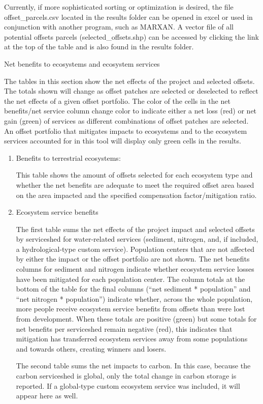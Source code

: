 \documentclass[11pt,letterpaper]{report}
\newenvironment{myenumerate}{%
	\edef\backupindent{\the\parindent}
	\enumerate
	\setlength{\parindent}{\backupindent}
		\setlist[enumerate,1]{label=(\arabic*)}
		\setlist[enumerate,2]{label=(\arabic*)}
}{\endenumerate}
\begin{document}
\begin{myenumerate}
			Currently, if more sophisticated sorting or optimization is desired, the file offset\_{}parcels.csv located in the results folder can be opened in excel or used in conjunction with another program, such as MARXAN. A vector file of all potential offsets parcels (selected\_{}offsets.shp) can be accessed by clicking the link at the top of the table and is also found in the results folder.
		
		{\bfseries \item  Net benefits to ecosystems and ecosystem services}
		
			The tables in this section show the net effects of the project and selected offsets. The totals shown will change as offset patches are selected or deselected to reflect the net effects of a given offset portfolio. The color of the cells in the net benefits/net service column change color to indicate either a net loss (red) or net gain (green) of services as different combinations of offset patches are selected. An offset portfolio that mitigates impacts to ecosystems and to the ecosystem services accounted for in this tool will display only green cells in the results. 
			
			\begin{enumerate}[label=\alph*]
				\item Benefits to terrestrial ecosystems:
				
					This table shows the amount of offsets selected for each ecosystem type and whether the net benefits are adequate to meet the required offset area based on the area impacted and the specified compensation factor/mitigation ratio.
					
				\item Ecosystem service benefits
				
					The first table sums the net effects of the project impact and selected offsets by serviceshed for water-related services (sediment, nitrogen, and, if included, a hydrological-type custom service). Population centers that are not affected by either the impact or the offset portfolio are not shown. The net benefits columns for sediment and nitrogen indicate whether ecosystem service losses have been mitigated for each population center. The column totals at the bottom of the table for the final columns (``net sediment * population'' and ``net nitrogen * population'') indicate whether, across the whole population, more people receive ecosystem service benefits from offsets than were lost from development. When these totals are positive (green) but some totals for net benefits per serviceshed remain negative (red), this indicates that mitigation has transferred ecosystem services away from some populations and towards others, creating winners and losers.
					
					The second table sums the net impacts to carbon. In this case, because the carbon serviceshed is global, only the total change in carbon storage is reported. If a global-type custom ecosystem service was included, it will appear here as well.
			\end{enumerate}
	\end{myenumerate}
\end{document}
